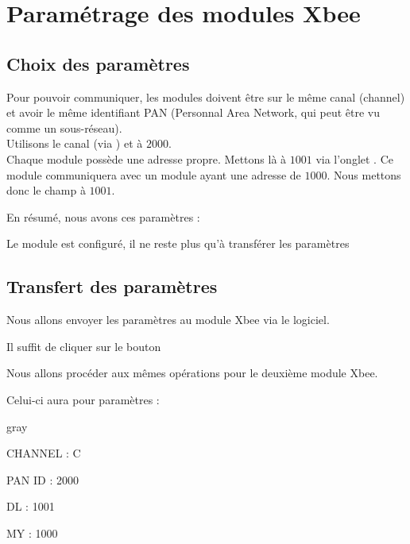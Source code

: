 \label{xbee}
\section{Paramétrage des modules Xbee}

\subsection{Choix des paramètres}

Pour pouvoir communiquer, les modules doivent être sur le même canal (channel) et avoir le même identifiant PAN (Personnal Area Network, qui peut être vu comme un sous-réseau).\\


Utilisons le canal  (via ) et   à $2000$.\\
Chaque module possède une adresse propre. Mettons là à $1001$ via l'onglet .
Ce module communiquera avec un module ayant une adresse de $1000$.
 Nous mettons donc le champ  à $1001$.

En résumé, nous avons ces paramètres :






Le module est configuré, il ne reste plus qu'à transférer les paramètres

\subsection{Transfert des paramètres}

Nous allons envoyer les paramètres au module Xbee via le logiciel.

Il suffit de cliquer sur le bouton 


Nous allons procéder aux mêmes opérations pour le deuxième module Xbee.

Celui-ci aura pour paramètres : 

\begin{items}{gray}{\faGear}
\item CHANNEL : C
\item PAN ID : 2000
\item DL : 1001
\item MY : 1000
\end{items}


